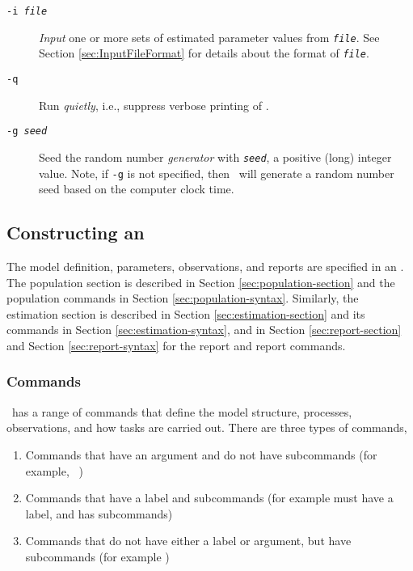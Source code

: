 \begin{description}
\item [\texttt{-i \emph{file}}] \emph{Input} one or more sets of estimated parameter values from \texttt{\emph{file}}. See Section \ref{sec:InputFileFormat} for details about the format of \texttt{\emph{file}}.


\item [\texttt{-q}] Run \emph{quietly}, i.e., suppress verbose printing of \SPM.

\item [\texttt{-g \emph{seed}}]  Seed the random number \emph{generator} with \texttt{\emph{seed}}, a positive (long) integer value. Note, if \texttt{-g} is not specified, then \SPM\ will  generate a random number seed based on the computer clock time.
\end{description}

\subsection{Constructing an \SPM\ \config \label{constructing-spm-config}}

The model definition, parameters, observations, and reports are specified in an \config. The  population section is described in Section \ref{sec:population-section} and the population commands in Section \ref{sec:population-syntax}. Similarly, the estimation section is described in Section \ref{sec:estimation-section} and its commands in Section \ref{sec:estimation-syntax}, and in Section \ref{sec:report-section} and Section \ref{sec:report-syntax} for the report and report commands. 

\subsubsection{Commands}

\SPM\ has a range of commands that define the model structure, processes, observations, and how tasks are carried out. There are three types of commands, 

\begin{enumerate}
\item Commands that have an argument and do not have subcommands (for example, \ )
\item Commands that have a label and subcommands (for example  must have a label, and has subcommands)
\item Commands that do not have either a label or argument, but have subcommands (for example )
\end{enumerate}

